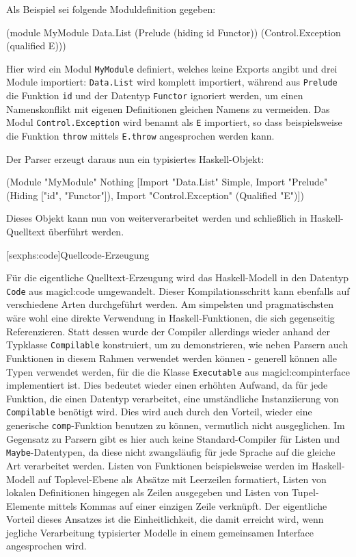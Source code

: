 \documentclass[11pt, a4paper, bibgerm]{scrbook}
\newcommand\icode[1]{\lstinline?#1?}
\newcommand\lsection{}
\newcommand\sref{}
\begin{document}
Als Beispiel sei folgende Moduldefinition gegeben:
\begin{code}
(module MyModule
  Data.List
  (Prelude (hiding id Functor))
  (Control.Exception (qualified E)))
\end{code}
Hier wird ein Modul \icode{MyModule} definiert, welches keine Exports
angibt und drei Module importiert: \icode{Data.List} wird komplett
importiert, während aus \icode{Prelude} die Funktion \icode{id} und der
Datentyp \icode{Functor} ignoriert werden, um einen Namenskonflikt mit
eigenen Definitionen gleichen Namens zu vermeiden. Das Modul
\icode{Control.Exception} wird benannt als \icode{E} importiert, so dass
beispielsweise die Funktion \icode{throw} mittels \icode{E.throw}
angesprochen werden kann.

Der Parser erzeugt daraus nun ein typisiertes Haskell-Objekt:
\begin{code}
(Module "MyModule"
         Nothing
         [Import "Data.List" Simple,
          Import "Prelude" (Hiding ["id", "Functor"]),
          Import "Control.Exception" (Qualified "E")])
\end{code}
Dieses Objekt kann nun von weiterverarbeitet werden und schließlich in
Haskell-Quelltext überführt werden.

\lsection[sexphs:code]{Quellcode-Erzeugung}

Für die eigentliche Quelltext-Erzeugung wird das Haskell-Modell in den
Datentyp \icode{Code} aus \sref{magicl:code} umgewandelt. Dieser
Kompilationsschritt kann ebenfalls auf verschiedene Arten durchgeführt
werden. Am simpelsten und pragmatischsten wäre wohl eine direkte
Verwendung in Haskell-Funktionen, die sich gegenseitig
Referenzieren. Statt dessen wurde der Compiler allerdings wieder
anhand der Typklasse \icode{Compilable} konstruiert, um zu
demonstrieren, wie neben Parsern auch Funktionen in diesem Rahmen
verwendet werden können - generell können alle Typen verwendet werden,
für die die Klasse \icode{Executable} aus \sref{magicl:compinterface}
implementiert ist. Dies bedeutet wieder einen erhöhten Aufwand, da für
jede Funktion, die einen Datentyp verarbeitet, eine umständliche
Instanziierung von \icode{Compilable} benötigt wird. Dies wird auch
durch den Vorteil, wieder eine generische \icode{comp}-Funktion
benutzen zu können, vermutlich nicht ausgeglichen. Im Gegensatz zu
Parsern gibt es hier auch keine Standard-Compiler für Listen und
\icode{Maybe}-Datentypen, da diese nicht zwangsläufig für jede Sprache
auf die gleiche Art verarbeitet werden. Listen von Funktionen
beispielsweise werden im Haskell-Modell auf Toplevel-Ebene als Absätze
mit Leerzeilen formatiert, Listen von lokalen Definitionen hingegen
als Zeilen ausgegeben und Listen von Tupel-Elemente mittels Kommas
auf einer einzigen Zeile verknüpft. Der eigentliche Vorteil dieses
Ansatzes ist die Einheitlichkeit, die damit erreicht wird, wenn
jegliche Verarbeitung typisierter Modelle in einem gemeinsamen
Interface angesprochen wird.
\end{document}
